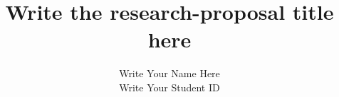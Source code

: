 \documentclass[a4paper]{article}
\title{Write the research-proposal title here}
\author{Write Your Name Here \\ Write Your Student ID}
\date{}
\begin{document}
\maketitle



\nocite{*}


\end{document}
